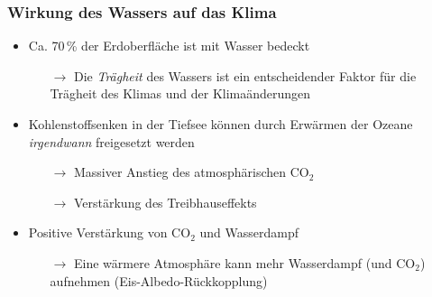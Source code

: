 \begin{frame}
	\frametitle{Wirkung des Wassers auf das Klima}
	\begin{itemize}
		\item Ca. 70\,\% der Erdoberfläche ist mit Wasser bedeckt
		\begin{itemize}
			\item[$\rightarrow$] Die \textit{Trägheit} des Wassers ist ein entscheidender Faktor für die Trägheit des Klimas und der Klimaänderungen %
		\end{itemize}
		\item Kohlenstoffsenken in der Tiefsee können durch Erwärmen der Ozeane \textit{irgendwann} freigesetzt werden
		\begin{itemize}
			\item[$\rightarrow$] Massiver Anstieg des atmosphärischen CO$_2$
			\item[$\rightarrow$] Verstärkung des Treibhauseffekts
		\end{itemize}
		\item Positive Verstärkung von CO$_2$ und Wasserdampf
		\begin{itemize}
			\item[$\rightarrow$] Eine wärmere Atmosphäre kann mehr Wasserdampf (und CO$_2$) aufnehmen (Eis-Albedo-Rückkopplung)
		\end{itemize}
	\end{itemize}
\end{frame}

